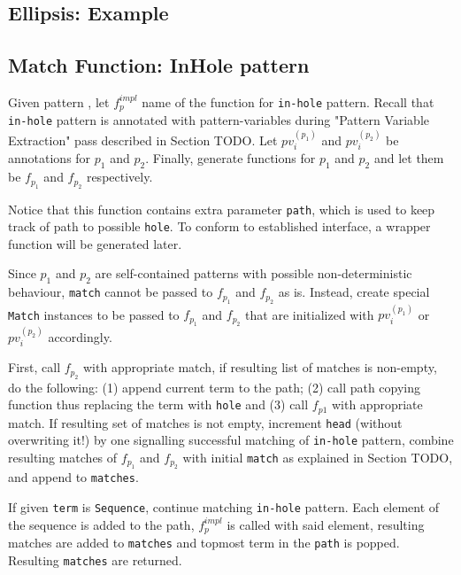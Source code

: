 \subsection{Ellipsis: Example}


\subsection{Match Function: InHole pattern}
Given pattern \InHolePattern, let $f_p^{impl}$ name of the function for \texttt{in-hole} pattern. Recall that \texttt{in-hole} pattern is annotated with pattern-variables during "Pattern Variable Extraction" pass described in Section TODO. Let $pv_i^{(p_1)}$ and $pv_i^{(p_2)}$ be annotations for $p_1$ and $p_2$. Finally, generate functions for $p_1$ and $p_2$ and let them be $f_{p_1}$ and $f_{p_2}$ respectively. 

Notice that this function contains extra parameter \texttt{path}, which is used to keep track of path to possible \texttt{hole}. To conform to established interface, a wrapper function will be generated later.

Since $p_1$ and $p_2$ are self-contained patterns with possible non-deterministic behaviour, \texttt{match} cannot be passed to $f_{p_1}$ and $f_{p_2}$ as is. Instead, create special \texttt{Match} instances to be passed to $f_{p_1}$ and $f_{p_2}$ that are initialized with $pv_i^{(p_1)}$ or $pv_i^{(p_2)}$ accordingly.

First, call $f_{p_2}$ with appropriate match, if resulting list of matches is non-empty, do the following: (1) append current term to the path; (2) call path copying function thus replacing the term with \texttt{hole} and (3) call $f_{p1}$ with appropriate match. If resulting set of matches is not empty, increment \texttt{head} (without overwriting it!) by one signalling successful matching of \texttt{in-hole} pattern, combine resulting matches of $f_{p_1}$ and $f_{p_2}$ with initial \texttt{match} as explained in Section TODO, and append to \texttt{matches}.

If given \texttt{term} is \texttt{Sequence}, continue matching \texttt{in-hole} pattern. Each element of the sequence is added to the path, $f_p^{impl}$ is called with said element, resulting matches are added to \texttt{matches} and topmost term in the \texttt{path} is popped. Resulting \texttt{matches} are returned.

